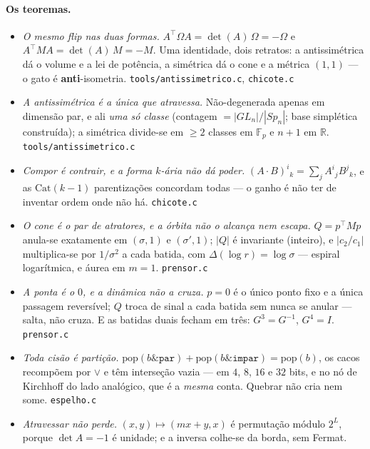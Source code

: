 \documentclass[11pt]{article}
\newcommand{\code}[1]{\texttt{\small #1}}
\newcommand{\R}{\mathbb R}
\newcommand{\F}{\mathbb F}
\theoremstyle{plain}
\theoremstyle{remark}
\begin{document}
\paragraph{Os teoremas.}
\begin{itemize}\itemsep3pt
\item[\textbf{T1}] \emph{O mesmo flip nas duas formas.} $A^{\!\top}\Omega A=\det(A)\,\Omega=-\Omega$ e
$A^{\!\top}MA=\det(A)\,M=-M$. Uma identidade, dois retratos: a antissimétrica dá o volume e a lei de
potência, a simétrica dá o cone e a métrica $(1,1)$ --- o gato é \textbf{anti}-isometria.
\hfill{\small\code{tools/antissimetrico.c}, \code{chicote.c}}
\item[\textbf{T2}] \emph{A antissimétrica é a única que atravessa.} Não-degenerada apenas em dimensão
par, e ali \emph{uma só classe} (contagem $=|GL_n|/|Sp_n|$; base simplética construída); a simétrica
divide-se em $\ge2$ classes em $\F_p$ e $n+1$ em $\R$.
\hfill{\small\code{tools/antissimetrico.c}}
\item[\textbf{T3}] \emph{Compor é contrair, e a forma $k$-ária não dá poder.} $(A\!\cdot\!B)^i{}_k=\sum_j
A^i{}_jB^j{}_k$, e as $\mathrm{Cat}(k-1)$ parentizações concordam todas --- o ganho é não ter de
inventar ordem onde não há.
\hfill{\small\code{chicote.c}}
\item[\textbf{T4}] \emph{O cone é o par de atratores, e a órbita não o alcança nem escapa.} $Q=p^{\!\top}Mp$
anula-se exatamente em $(\sigma,1)$ e $(\sigma',1)$; $|Q|$ é invariante (inteiro), e
$|c_2/c_1|$ multiplica-se por $1/\sigma^2$ a cada batida, com $\Delta(\log r)=\log\sigma$ --- espiral
logarítmica, e áurea em $m=1$.
\hfill{\small\code{prensor.c}}
\item[\textbf{T5}] \emph{A ponta é o $0$, e a dinâmica não a cruza.} $p=0$ é o único ponto fixo e a
única passagem reversível; $Q$ troca de sinal a cada batida sem nunca se anular --- salta, não cruza.
E as batidas duais fecham em três: $G^3=G^{-1}$, $G^4=I$.
\hfill{\small\code{prensor.c}}
\item[\textbf{T6}] \emph{Toda cisão é partição.} $\mathrm{pop}(b\&\mathtt{par})+\mathrm{pop}(b\&\mathtt{impar})
=\mathrm{pop}(b)$, os cacos recompõem por $\vee$ e têm interseção vazia --- em $4$, $8$, $16$ e $32$
bits, e no nó de Kirchhoff do lado analógico, que é a \emph{mesma} conta. Quebrar não cria nem some.
\hfill{\small\code{espelho.c}}
\item[\textbf{T7}] \emph{Atravessar não perde.} $(x,y)\mapsto(mx+y,x)$ é permutação módulo $2^L$,
porque $\det A=-1$ é unidade; e a inversa colhe-se da borda, sem Fermat.

\end{itemize}
\end{document}
